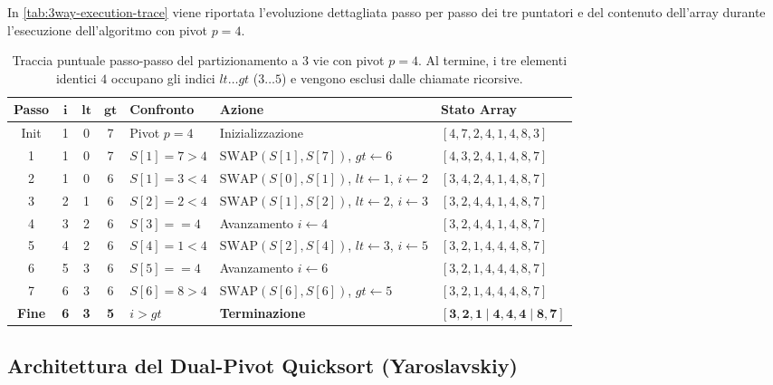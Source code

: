 In \autoref{tab:3way-execution-trace} viene riportata l'evoluzione dettagliata passo per passo dei tre puntatori e del contenuto dell'array durante l'esecuzione dell'algoritmo con pivot $p = 4$.

\begin{table}[H]
  \centering
  \small
  \begin{tabularx}{\textwidth}{c c c c >{\centering\arraybackslash}p{2.6cm} >{\raggedright\arraybackslash}X >{\centering\arraybackslash}p{3.2cm}}
    \toprule
    \textbf{Passo} & $\boldsymbol{i}$ & $\boldsymbol{lt}$ & $\boldsymbol{gt}$ & \textbf{Confronto} & \textbf{Azione} & \textbf{Stato Array} \\
    \midrule
    Init & 1 & 0 & 7 & Pivot $p = 4$ & Inizializzazione & $[4, 7, 2, 4, 1, 4, 8, 3]$ \\
    1 & 1 & 0 & 7 & $S[1]=7 > 4$ & $\text{SWAP}(S[1], S[7])$, $gt \leftarrow 6$ & $[4, 3, 2, 4, 1, 4, 8, 7]$ \\
    2 & 1 & 0 & 6 & $S[1]=3 < 4$ & $\text{SWAP}(S[0], S[1])$, $lt \leftarrow 1$, $i \leftarrow 2$ & $[3, 4, 2, 4, 1, 4, 8, 7]$ \\
    3 & 2 & 1 & 6 & $S[2]=2 < 4$ & $\text{SWAP}(S[1], S[2])$, $lt \leftarrow 2$, $i \leftarrow 3$ & $[3, 2, 4, 4, 1, 4, 8, 7]$ \\
    4 & 3 & 2 & 6 & $S[3] == 4$ & Avanzamento $i \leftarrow 4$ & $[3, 2, 4, 4, 1, 4, 8, 7]$ \\
    5 & 4 & 2 & 6 & $S[4]=1 < 4$ & $\text{SWAP}(S[2], S[4])$, $lt \leftarrow 3$, $i \leftarrow 5$ & $[3, 2, 1, 4, 4, 4, 8, 7]$ \\
    6 & 5 & 3 & 6 & $S[5] == 4$ & Avanzamento $i \leftarrow 6$ & $[3, 2, 1, 4, 4, 4, 8, 7]$ \\
    7 & 6 & 3 & 6 & $S[6]=8 > 4$ & $\text{SWAP}(S[6], S[6])$, $gt \leftarrow 5$ & $[3, 2, 1, 4, 4, 4, 8, 7]$ \\
    \midrule
    \textbf{Fine} & \textbf{6} & \textbf{3} & \textbf{5} & $i > gt$ & \textbf{Terminazione} & $\mathbf{[3, 2, 1 \mid 4, 4, 4 \mid 8, 7]}$ \\
    \bottomrule
  \end{tabularx}
  \caption{Traccia puntuale passo-passo del partizionamento a 3 vie con pivot $p = 4$. Al termine, i tre elementi identici $4$ occupano gli indici $lt \dots gt$ ($3 \dots 5$) e vengono esclusi dalle chiamate ricorsive.}
  \label{tab:3way-execution-trace}
\end{table}

\FloatBarrier

\subsection{Architettura del Dual-Pivot Quicksort (Yaroslavskiy)}
\label{subsec:dual-pivot-architecture}

